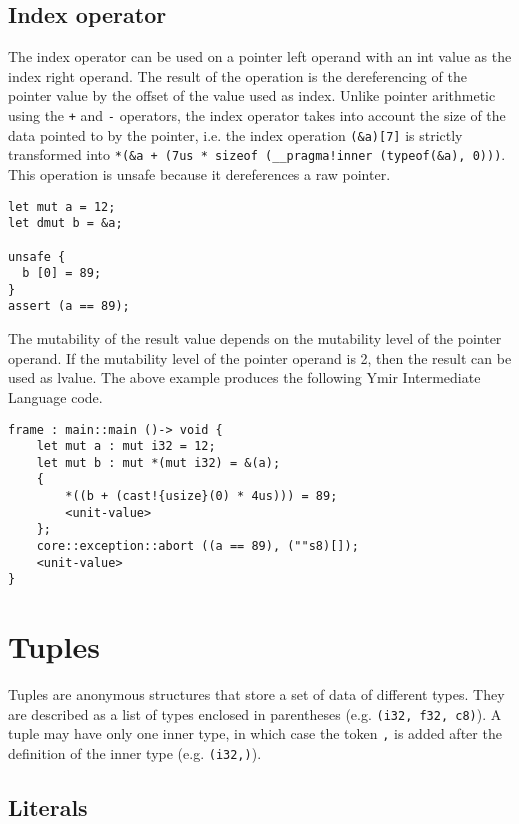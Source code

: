 \subsection {Index operator}

The index operator can be used on a pointer left operand with an int value as
the index right operand. The result of the operation is the dereferencing of the
pointer value by the offset of the value used as index. Unlike pointer
arithmetic using the \texttt{+} and \texttt{-} operators, the index operator
takes into account the size of the data pointed to by the pointer, i.e. the
index operation \texttt{(\&a)[7]} is strictly transformed into \texttt{*(\&a +
  (7us * sizeof (\_\_pragma!inner (typeof(\&a), 0)))}. This operation is unsafe because it
dereferences a raw pointer.

\smallskip

\begin{lstlisting}[style=coloredverbatim]
let mut a = 12;
let dmut b = &a;

unsafe {
  b [0] = 89;
}
assert (a == 89);
\end{lstlisting}

\smallskip

The mutability of the result value depends on the mutability level of the
pointer operand. If the mutability level of the pointer operand is 2, then the
result can be used as lvalue. The above example produces the following Ymir Intermediate Language code.

\begin{lstlisting}[style=intermediateVerb]
frame : main::main ()-> void {
    let mut a : mut i32 = 12;
    let mut b : mut *(mut i32) = &(a);
    {
        *((b + (cast!{usize}(0) * 4us))) = 89;
        <unit-value>
    };
    core::exception::abort ((a == 89), (""s8)[]);
    <unit-value>
}
\end{lstlisting}

\section {Tuples}


Tuples are anonymous structures that store a set of data of different types.
They are described as a list of types enclosed in parentheses (e.g.
\texttt{(i32, f32, c8)}). A tuple may have only one inner type, in which case
the token \texttt{,} is added after the definition of the inner type (e.g.
\texttt{(i32,)}).

\subsection {Literals}


